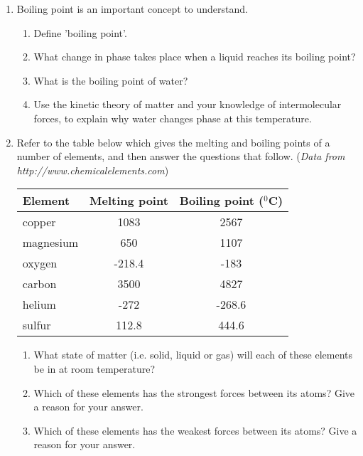 {\begin{enumerate}
\item{Boiling point is an important concept to understand.
	\begin{enumerate}
	\item{Define 'boiling point'.}
	\item{What change in phase takes place when a liquid reaches its boiling point?}
	\item{What is the boiling point of water?}
	\item{Use the kinetic theory of matter and your knowledge of intermolecular forces, to explain why water changes phase at this temperature.}
	\end{enumerate}
}
\item{Refer to the table below which gives the melting and boiling points of a number of elements, and then answer the questions that follow. (\textit{Data from http://www.chemicalelements.com})

\begin{center}
\begin{tabular}{|l|c|c|}\hline
\textbf{Element} & \textbf{Melting point} & \textbf{Boiling point ($^{0}$C)}\\\hline
copper & 1083 & 2567 \\\hline
magnesium & 650 & 1107 \\\hline
oxygen & -218.4 & -183 \\\hline
carbon & 3500 & 4827 \\\hline
helium & -272 & -268.6 \\\hline
sulfur & 112.8 & 444.6 \\\hline
\end{tabular}
\end{center}
	\begin{enumerate}
	\item{What state of matter (i.e. solid, liquid or gas) will each of these elements be in at room temperature?}
	\item{Which of these elements has the strongest forces between its atoms? Give a reason for your answer.}
	\item{Which of these elements has the weakest forces between its atoms? Give a reason for your answer.}
	\end{enumerate}
}

\end{enumerate}
}






